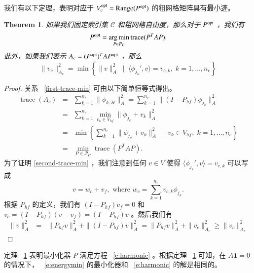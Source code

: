 \documentclass[12pt]{acta_2011xz}
\newcommand{\trace}{\ensuremath{\operatorname{trace}}}
\newtheorem{theorem}{Theorem}[section]
\DeclareMathOperator*{\argmin}{arg\,min}
\DeclareMathOperator*{\range}{Range}
\begin{document}
我们有以下定理，表明对应于
   $V^{\rm opt}_c=\range(P^{\rm{opt}})$    的粗网格矩阵具有最小迹。
   \begin{theorem}   \label{t:energymin}    如果我们固定索引集    $\mathcal C$    和粗网格自由度，那么对于    $P^{\rm opt}$   ，我们有
   \begin{equation}\label{first-trace-min}
P^{\rm opt}=\argmin_{P\in \mathcal{P}_C}\trace(P^TAP).
\end{equation}    
此外，如果我们表示    $A_c=(P^{\rm opt})^TAP^{\rm opt}$    ，那么
   \begin{equation}\label{second-trace-min}
    \|v_c\|_{A_c}^2 = \min\left \{ \|v\|^2_A \;\;\bigg|\;\;
\langle \phi_{j_k}',v\rangle=v_{c,k}, \; k=1,\ldots,n_c \right \} 
\end{equation}     \end{theorem}    
   \begin{proof}关系~    \eqref{first-trace-min}    可由以下简单恒等式得出。
   \begin{eqnarray*} 
\trace(A_c) & = &
\sum_{k=1}^{n_c}\|\phi_{k,H}\|_A^2 =
\sum_{k=1}^{n_c}\|(I-P_{hf})\phi_{j_k}\|_A^2  \\  & = &
\sum_{k=1}^{n_c}\min_{v_{k}\in V_{hf}}\|\phi_{j_k}+v_{k}\|_A^2  \\ 
& = &
\min\left \{ \sum_{k=1}^{n_c}\|\phi_{j_k}+v_{k}\|_A^2\;\;\bigg|\;\;
v_{k}\in V_{hf}, \; k=1,\ldots,n_c\right \}  \\  &=&\min_{P\in
\mathcal{P}_C}\trace(P^TAP).
\end{eqnarray*}    
为了证明    \eqref{second-trace-min}    ，我们注意到任何 
   $v\in V$    使得    $\langle\phi_{j_k}',v\rangle=v_{c,k}$    可以写成 
   \begin{equation*}
    v= w_c+v_f, \text{ where }   w_c=\sum_{k=1}^{n_c}v_{c,k}\phi_{j_k}.
\end{equation*}    根据    $P_{hf}$    的定义，我们有    $(I-P_{hf})v_f=0$    和
   $v_c=(I-P_{hf})(v-v_f)=(I-P_{hf})v$    。然后我们有
   \begin{eqnarray*}
 \|v\|_A^2 &=& \|P_{hf}v\|_A^2+\|(I-P_{hf})v\|_A^2 
=\|P_{hf}v\|_A^2+\|v_c\|_{A_c}^2
\ge \|v_c\|_{A_c}^2
\end{eqnarray*}     \end{proof}     

定理~    \ref{t:energymin}    表明最小化器    $P$    满足方程~    \eqref{e:harmonic}    。根据定理~    \ref{t:energymin}    可知，在    $A\bm{1}=0$    的情况下，~    \eqref{e:energymin}    的最小化器和~    \eqref{e:harmonic}    的解是相同的。  
\end{document}
